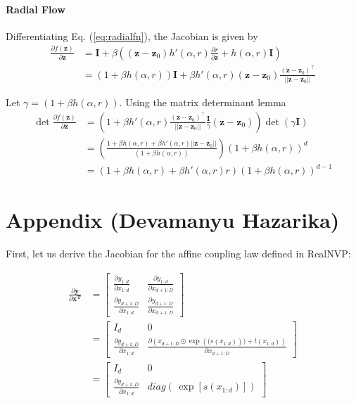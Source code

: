 \documentclass[runningheads]{llncs}
\begin{document}
\paragraph{Radial Flow} Differentiating Eq. (\ref{eq:radialfn}), the Jacobian is given by
\begin{align*}
\frac{\partial f(\mathbf{z})}{\partial \mathbf{z}} &= \mathbf{I} + \beta\left((\mathbf{z}-\mathbf{z}_0)h'(\alpha,r)\frac{\partial r}{\partial \mathbf{z}} + h(\alpha,r)\mathbf{I}\right)\\
&=(1+\beta h(\alpha,r))\mathbf{I} + \beta h'(\alpha,r)(\mathbf{z}-\mathbf{z}_0)\frac{(\mathbf{z}-\mathbf{z}_0)^\top}{||\mathbf{z}-\mathbf{z}_0||}
\end{align*}

Let $\gamma = (1+\beta h(\alpha,r))$. Using the matrix determinant lemma
\begin{align}
\det\frac{\partial f(\mathbf{z})}{\partial \mathbf{z}} &= \left(1 + \beta h'(\alpha,r)\frac{(\mathbf{z}-\mathbf{z}_0)^\top}{||\mathbf{z}-\mathbf{z}_0||}\frac{\mathbf{I}}{\gamma}(\mathbf{z}-\mathbf{z}_0)\right)\det(\gamma\mathbf{I})\\
&=\left(\frac{1 + \beta h(\alpha,r) + \beta h'(\alpha,r)||\mathbf{z}-\mathbf{z}_0||}{(1+\beta h(\alpha,r))}\right)(1+\beta h(\alpha,r))^d\\
&=\left(1 + \beta h(\alpha,r) + \beta h'(\alpha,r)r\right)(1+\beta h(\alpha,r))^{d-1}\label{eq:radial-det}
\end{align}

\section{Appendix (Devamanyu Hazarika)}

First, let us derive the Jacobian for the affine coupling law defined in RealNVP:

\begin{align*}
\frac{\partial \mathbf{y}}{\partial \mathbf{x^T}} &= \begin{bmatrix}
\frac{\partial y_{1:d}}{\partial x_{1:d}} & \frac{\partial y_{1:d}}{\partial x_{d+1:D}} \\
\frac{\partial y_{d+1:D}}{\partial x_{1:d}} & \frac{\partial y_{d+1:D}}{\partial x_{d+1:D}} 
\end{bmatrix}\\
&= \begin{bmatrix}
I_{d} & 0 \\
\frac{\partial y_{d+1:D}}{\partial x_{1:d}} & \frac{\partial \left(x_{d+1:D} \odot \exp\left((s(x_{1:d})\right)) + t(x_{1:d})\right)}{\partial x_{d+1:D}} 
\end{bmatrix}\\
&= \begin{bmatrix}
I_{d} & 0 \\
\frac{\partial y_{d+1:D}}{\partial x_{1:d}} & diag\left(\,\exp[s(x_{1:d})]\right)
\end{bmatrix}
\end{align*}
\end{document}
